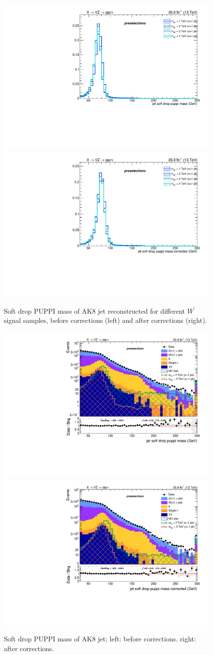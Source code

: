 \begin{figure}[!htb]
  \begin{center}
    \includegraphics[width=.495\textwidth]{plots/v9_thesis/XVZnnPre/FatJet1_softdropPuppiMass_signalWZ.pdf}
    \includegraphics[width=.495\textwidth]{plots/v9_thesis/XVZnnPre/FatJet1_softdropPuppiMassCorr_signalWZ.pdf}
  \end{center}
  \caption{Soft drop PUPPI mass of AK8 jet reconstructed for different $W^{'}$ signal samples, before corrections (left) and after corrections (right).}
  \label{fig:fatjet_pre_softdroppuppimass_WZ}
\end{figure}

\begin{figure}[!htb]
  \begin{center}
    \includegraphics[width=.495\textwidth]{plots/v9_thesis/XVZnnPre/FatJet1_softdropPuppiMass.pdf}
    \includegraphics[width=.495\textwidth]{plots/v9_thesis/XVZnnPre/FatJet1_softdropPuppiMassCorr.pdf}
  \end{center}
  \caption{Soft drop PUPPI mass of AK8 jet; left: before corrections. right: after corrections.}
  \label{fig:fatjet_softdroppuppimass}
\end{figure}


